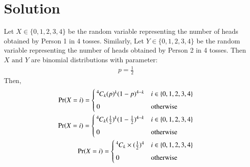 \documentclass[journal,12pt,twocolumn]{IEEEtran}
\begin{document}
\section*{Solution}
Let $X \in \{ 0, 1, 2, 3, 4\}$ be the random variable representing the number of heads obtained by Person 1 in 4 tosses. Similarly, Let $Y \in \{ 0, 1, 2, 3, 4\}$ be the random variable representing the number of heads obtained by Person 2 in 4 tosses. Then $X \text{ and } Y$ are binomial distributions with parameter:
\begin{align}
    p = \frac{1}{2}
\end{align}
Then,
\begin{align}
    \Pr(X=i) = 
	\begin{cases}
	\comb[4]{k}(p)^k(1-p)^{4-k} &  i \in \{0, 1, 2, 3, 4\}\\ ~\\[-1em]
	0 & \text{otherwise}
	\end{cases}
	\\\Pr(X=i) = 
	\begin{cases}
	\comb[4]{k}(\frac{1}{2})^k(1-\frac{1}{2})^{4-k}  &  i \in \{0, 1, 2, 3, 4\}\\ ~\\[-1em]
	0 & \text{otherwise}
	\end{cases}
	\\\Pr(X=i) = 
	\begin{cases}
	\comb[4]{k}\times(\frac{1}{2})^4  &  i \in \{0, 1, 2, 3, 4\}\\ ~\\[-1em]
	0 & \text{otherwise}
	\end{cases}
\end{align}
\begin{center}
\begin{table}[h]
    \centering
    \caption{Probability distribution table of X}
    \label{table 1}
\end{table}
\end{center}
\end{document}
